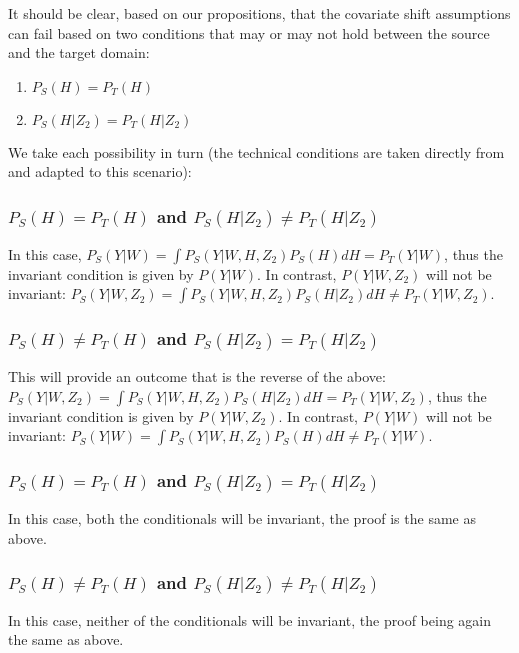 \documentclass[a4paper,12pt]{article}
\begin{document}
It should be clear, based on our propositions, that the covariate shift assumptions can fail based on two conditions that may or may not hold between the source and the target domain: 

\begin{enumerate}
\item $P_S(H) = P_T(H)$
\item $P_S(H|Z_2) = P_T(H|Z_2)$
\end{enumerate}

We take each possibility in turn (the technical conditions are taken directly from \cite{Pearl2014} and adapted to this scenario):

\subsubsection*{$P_S(H) = P_T(H)$ and $P_S(H|Z_2) \neq P_T(H|Z_2)$} 

In this case, $P_S(Y|W) = \int P_S(Y|W,H,Z_2)P_S(H) dH = P_T(Y|W)$, thus the invariant condition is given by $P(Y|W)$. In contrast, $P(Y|W,Z_2)$ will not be invariant: $P_S(Y|W,Z_2) = \int P_S(Y|W,H,Z_2)P_S(H|Z_2) dH \neq P_T(Y|W,Z_2)$.

\subsubsection*{$P_S(H) \neq P_T(H)$ and $P_S(H|Z_2) = P_T(H|Z_2)$}

This will provide an outcome that is the reverse of the above: $P_S(Y|W,Z_2) = \int P_S(Y|W,H,Z_2)P_S(H|Z_2) dH = P_T(Y|W,Z_2)$, thus the invariant condition is given by $P(Y|W,Z_2)$. In contrast, $P(Y|W)$ will not be invariant: $P_S(Y|W) = \int P_S(Y|W,H,Z_2)P_S(H) dH \neq P_T(Y|W)$.

\subsubsection*{$P_S(H) = P_T(H)$ and $P_S(H|Z_2) = P_T(H|Z_2)$} 

In this case, both the conditionals will be invariant, the proof is the same as above.

\subsubsection*{$P_S(H) \neq P_T(H)$ and $P_S(H|Z_2) \neq P_T(H|Z_2)$} 

In this case, neither of the conditionals will be invariant, the proof being again the same as above. 
\end{document}
